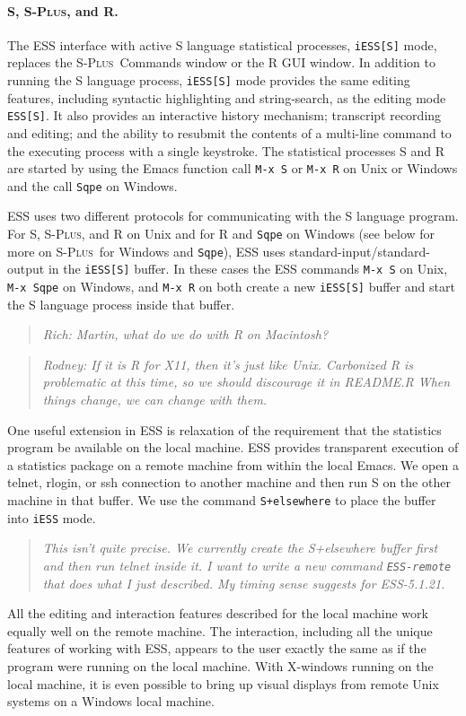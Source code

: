 \documentclass{article}
\newcommand*{\Splus}{\textsc{S-Plus}}
\newcommand{\stexttt}[1]{{\small\texttt{#1}}}
\newenvironment{Comment}{\begin{quote}\small\itshape }{\end{quote}}
\begin{document}
\paragraph{S, \Splus, and R.}
\label{sec:S:inf}

The ESS interface with active S language statistical processes,
\stexttt{iESS[S]} mode, replaces the \Splus\ Commands window or the R
GUI window.
In addition to running the S language process, \stexttt{iESS[S]} mode
provides the same editing features, including syntactic highlighting
and string-search, as the editing mode \stexttt{ESS[S]}.  It also
provides an interactive history mechanism; transcript recording and
editing; and the ability to resubmit the contents of a multi-line
command to the executing process with a single keystroke.  The
statistical processes S and R are started by using the Emacs function
call \stexttt{M-x~S} or \stexttt{M-x~R} on Unix or Windows and the
call \stexttt{Sqpe} on Windows.

ESS uses two different protocols for communicating with the S language
program.  For S, \Splus, and R on Unix and for R and \stexttt{Sqpe} on Windows
(see below for more on \Splus\ for Windows and \stexttt{Sqpe}), ESS uses
standard-input/standard-output in the \stexttt{iESS[S]} buffer.  In
these cases the ESS commands \stexttt{M-x~S} on Unix,
\stexttt{M-x~Sqpe} on Windows, and \stexttt{M-x~R} on both create a
new \stexttt{iESS[S]} buffer and start the S language process inside
that buffer.

\begin{Comment} Rich: Martin, what do we do with R on Macintosh?\end{Comment}
\begin{Comment} Rodney: If it is R for X11, then it's just like Unix.  
Carbonized R is problematic at this time, so we should discourage it in 
README.R  When things change, we can change with them.\end{Comment}

One useful extension in ESS is relaxation of the requirement that the
statistics program be available on the local machine.  ESS provides
transparent execution of a statistics package on a remote machine from
within the local Emacs.  We open a telnet,
rlogin, or ssh connection to another machine
and then run S on the other machine in that buffer.  
We use the command \stexttt{S+elsewhere} to place the buffer into
\stexttt{iESS} mode.
\begin{Comment}
This isn't quite precise.  We currently create the S+elsewhere buffer
first and then run telnet inside it.
I want to write a new command \stexttt{ESS-remote} that does what
I just described.  My timing sense suggests for ESS-5.1.21.
\end{Comment}
All the editing and interaction features described for
the local machine work equally well on the remote machine.
The interaction,
including all the unique features of working with ESS, appears to the
user exactly the same as if the program were running on the local
machine.  With X-windows running on the local machine, it is even
possible to bring up visual displays from remote Unix systems on a
Windows local machine.
\end{document}
